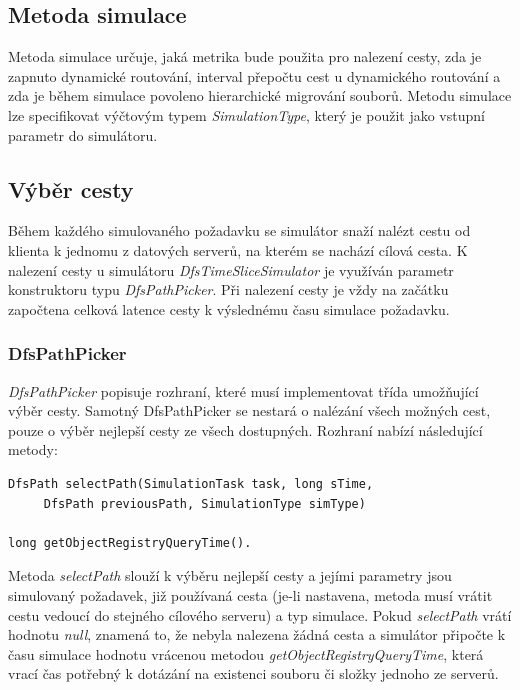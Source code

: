 \documentclass[czech,DP]{thesiskiv}
\begin{document}
\subsection{Metoda simulace} \label{typysimulace}

Metoda simulace určuje, jaká metrika bude použita pro nalezení cesty, zda je zapnuto dynamické routování, interval přepočtu cest u dynamického routování a zda je během simulace povoleno hierarchické migrování souborů. Metodu simulace lze specifikovat výčtovým typem \textit{SimulationType}, který je použit jako vstupní parametr do simulátoru.

\subsection{Výběr cesty}

Během každého simulovaného požadavku se simulátor snaží nalézt cestu od klienta k jednomu z datových serverů, na kterém se nachází cílová cesta. K nalezení cesty u simulátoru \textit{DfsTimeSliceSimulator} je využíván parametr konstruktoru typu \textit{DfsPathPicker}. Při nalezení cesty je vždy na začátku započtena celková latence cesty k výslednému času simulace požadavku.

\subsubsection*{DfsPathPicker}

\textit{DfsPathPicker} popisuje rozhraní, které musí implementovat třída umožňující výběr cesty. Samotný DfsPathPicker se nestará o nalézání všech možných cest, pouze o výběr nejlepší cesty ze všech dostupných. Rozhraní nabízí následující metody:

\begin{verbatim}
DfsPath selectPath(SimulationTask task, long sTime, 
     DfsPath previousPath, SimulationType simType)

long getObjectRegistryQueryTime().
\end{verbatim}

\noindent Metoda \textit{selectPath} slouží k výběru nejlepší cesty a jejími parametry jsou simulovaný požadavek, již používaná cesta (je-li nastavena, metoda musí vrátit cestu vedoucí do stejného cílového serveru) a typ simulace. Pokud \textit{selectPath} vrátí hodnotu \textit{null}, znamená to, že nebyla nalezena žádná cesta a simulátor připočte k času simulace hodnotu vrácenou metodou \textit{getObjectRegistryQueryTime}, která vrací čas potřebný k dotázání na existenci souboru či složky jednoho ze serverů.
\end{document}
